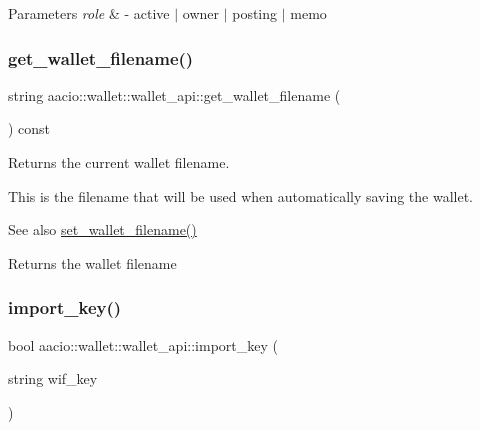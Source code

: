 \begin{DoxyParams}{Parameters}
{\em role} & -\/ active $\vert$ owner $\vert$ posting $\vert$ memo \\
\hline
\end{DoxyParams}
\mbox{\label{classaacio_1_1wallet_1_1wallet__api_a19392c5f842b71fb212e1ab126506876}} 
\subsubsection{\texorpdfstring{get\+\_\+wallet\+\_\+filename()}{get\_wallet\_filename()}}
{\footnotesize\ttfamily string aacio\+::wallet\+::wallet\+\_\+api\+::get\+\_\+wallet\+\_\+filename (\begin{DoxyParamCaption}{ }\end{DoxyParamCaption}) const}

Returns the current wallet filename.

This is the filename that will be used when automatically saving the wallet.

\begin{DoxySeeAlso}{See also}
\mbox{\hyperlink{classaacio_1_1wallet_1_1wallet__api_a208875f33af3cb0ec88e316c813f0ec8}{set\+\_\+wallet\+\_\+filename()}} 
\end{DoxySeeAlso}
\begin{DoxyReturn}{Returns}
the wallet filename 
\end{DoxyReturn}
\mbox{\label{classaacio_1_1wallet_1_1wallet__api_aa59ff70f12bd8dd9fa1d63cb3be09089}} 
\subsubsection{\texorpdfstring{import\+\_\+key()}{import\_key()}}
{\footnotesize\ttfamily bool aacio\+::wallet\+::wallet\+\_\+api\+::import\+\_\+key (\begin{DoxyParamCaption}\item[{string}]{wif\+\_\+key }\end{DoxyParamCaption})}

